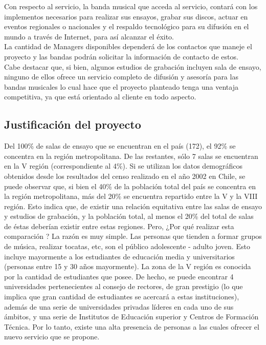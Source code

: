Con respecto al servicio, la banda musical 
que acceda al servicio, contará con los implementos 
necesarios para realizar sus ensayos, grabar sus 
discos, actuar en eventos regionales o nacionales 
y el respaldo tecnológico para su difusión en 
el mundo a través de Internet, para así alcanzar 
el éxito.\\

La cantidad de Managers disponibles dependerá de los
contactos que maneje el proyecto y las bandas podrán 
solicitar la información de contacto de estos.\\

Cabe destacar que, si bien, algunos estudios 
de grabación incluyen sala de ensayo, ninguno 
de ellos ofrece un servicio completo de 
difusión y asesoría para las bandas musicales 
lo cual hace que el proyecto planteado tenga 
una ventaja competitiva, ya que está 
orientado al cliente en todo aspecto.

\subsection{Justificación del proyecto}

Del 100\% de salas de ensayo que se encuentran en el país (172), el 92\% 
se concentra en la región metropolitana. De las restantes, sólo 7 salas se 
encuentran en la V región (correspondiente al 4\%). Si se utilizan los
datos demográficos obtenidos desde los resultados del censo realizado 
en el año 2002 en Chile, se puede observar que, si bien el 40\% de la 
población total del país se concentra en la región metropolitana, más
del 20\% se encuentra repartido entre la V y la VIII región. Esto indica que, 
de existir una relación equitativa entre las salas de ensayo y estudios de
grabación, y la población total, al menos el 20\% del total de salas de 
éstas deberían existir entre estas regiones. Pero, ¿Por qué realizar 
esta comparación ? La razón es muy simple. Las personas que tienden a 
formar grupos de música, realizar tocatas, etc, son el público adolescente
 - adulto joven. Esto incluye mayormente a los estudiantes de educación media
y universitarios (personas entre 15 y 30 años mayormente). La zona de la V 
región es conocida por la cantidad de estudiantes que posee. De hecho, 
se puede encontrar 4 universidades pertenecientes al consejo de rectores, de
gran prestigio (lo que implica que gran cantidad de estudiantes se acercará
a estas instituciones), además de una serie de universidades privadas 
líderes en cada uno de sus ámbitos, y una serie de Institutos de Educación
superior y Centros de Formación Técnica. Por lo tanto, existe una alta
presencia de personas a las cuales ofrecer el nuevo servicio que se propone.

